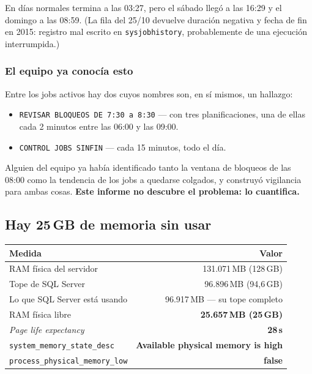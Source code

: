 \documentclass[11pt,a4paper]{article}
\newcommand{\cod}[1]{\texttt{\small #1}}
\newcommand{\critico}[1]{\textcolor{rojo}{\textbf{#1}}}
\newcommand{\bien}[1]{\textcolor{verde}{\textbf{#1}}}
\begin{document}
En días normales termina a las 03:27, pero el sábado llegó a las 16:29 y el
domingo a las 08:59. (La fila del 25/10 devuelve duración negativa y fecha de
fin en 2015: registro mal escrito en \cod{sysjobhistory}, probablemente de
una ejecución interrumpida.)

\subsubsection*{El equipo ya conocía esto}

Entre los jobs activos hay dos cuyos nombres son, en sí mismos, un hallazgo:

\begin{itemize}\itemsep1pt
  \item \cod{REVISAR BLOQUEOS DE 7:30 a 8:30} — con tres planificaciones, una
        de ellas cada 2 minutos entre las 06:00 y las 09:00.
  \item \cod{CONTROL JOBS SINFIN} — cada 15 minutos, todo el día.
\end{itemize}

Alguien del equipo ya había identificado tanto la ventana de bloqueos de las
08:00 como la tendencia de los jobs a quedarse colgados, y construyó
vigilancia para ambas cosas. \textbf{Este informe no descubre el problema: lo
cuantifica.}

\subsection{Hay 25\,GB de memoria sin usar}

\begin{table}[h]
\centering
\small
\begin{tabular}{lr}
\toprule
\textbf{Medida} & \textbf{Valor} \\
\midrule
RAM física del servidor        & 131.071\,MB (128\,GB) \\
Tope de SQL Server             & 96.896\,MB (94,6\,GB) \\
Lo que SQL Server está usando  & 96.917\,MB — su tope completo \\
RAM física libre               & \critico{25.657\,MB (25\,GB)} \\
\emph{Page life expectancy}    & \critico{28\,s} \\
\cod{system\_memory\_state\_desc} & \bien{Available physical memory is high} \\
\cod{process\_physical\_memory\_low} & \bien{false} \\
\bottomrule
\end{tabular}
\end{table}
\end{document}
